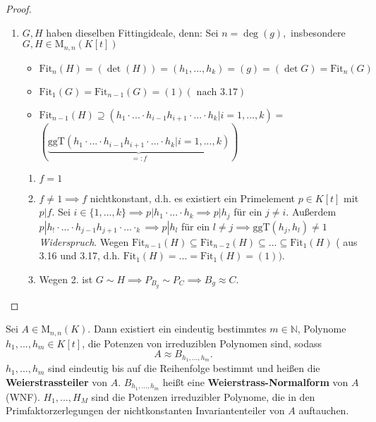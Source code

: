 \documentclass[a4paper, titlepage]{article}
\theoremstyle{definition}
\newcommand{\N}{\mathbb{N}}
\newcommand{\Fit}{\mathrm{Fit}}
\newcommand{\M}{\mathrm{M}}
\newcommand{\ggT}{\mathrm{ggT}}
\begin{document}
\begin{proof}
\begin{enumerate}[1.]
\begin{align*}
\begin{gmatrix}[p]
            & & & h_1 & &\\
            & & & & \ddots & \\
            & & & & & h_k
        \end{gmatrix}=:H\\
        P_{B_g}&\sim \begin{gmatrix}[p]
            1 & & & \\
            & \ddots &  &\\
            & & 1&\\
            & & &g
        \end{gmatrix}=: G
    \end{align*}
    \item $G,H$ haben dieselben Fittingideale, \newline denn: Sei $n=\deg(g),$ insbesondere $G,H\in\M_{n,n}(K[t])$\\
    \begin{itemize}
        \item $\Fit_{n}(H)=(\det(H))=(h_1,...,h_k)=(g)=(\det G)=\Fit_n(G)$
        \item $\Fit_{1}(G)= \Fit_{n-1}(G)=(1) (\text{ nach }3.17)$
        \item $\Fit_{n-1}(H)\supseteq (h_1\cdot...\cdot h_{i-1}h_{i+1}\cdot... \cdot h_k| i=1,...,k)=$ \newline$(\underbrace{\ggT(h_1\cdot...\cdot h_{i-1}h_{i+1}\cdot ...\cdot h_k|i=1,...,k)}_{=: f})$
    \end{itemize}
    \begin{enumerate}
        \item [\textbf{Behauptung:}] $f=1$
        \item [\textbf{Annahme:}] $f\neq 1 \implies f$ nichtkonstant, d.h. es existiert ein Primelement $p\in K[t]$ mit $p|f.$ Sei $i\in \{1,...,k\}\implies p|h_1\cdot...\cdot h_k\implies p|h_j$ für ein $j\neq i.$ Außerdem $p|h_!\cdot...\cdot h_{j-1}h_{j+1}\cdot...\cdot_{k}\implies p|h_l$ für ein $l\neq j\implies \ggT(h_j,h_l)\neq 1$ \textit{Widerspruch}. Wegen $\Fit_{n-1}(H)\subseteq \Fit_{n-2}(H)\subseteq ... \subseteq \Fit_{1}(H)$ ( aus 3.16 und 3.17, d.h. $\Fit_{1}(H)=...=\Fit_{1}(H)=(1)).$
        \item Wegen 2. ist $G\sim H \implies P_{B_g}\sim P_C\implies B_g\approx C.$ 
    \end{enumerate}
\end{enumerate}
\end{proof}
\begin{satz}
    Sei $A\in\M_{n,n}(K).$ Dann existiert ein eindeutig bestimmtes $m\in\N$, Polynome $h_1,...,h_m\in K[t]$, die Potenzen von irreduziblen Polynomen sind, sodass 
    $$A\approx B_{h_1,...,h_m}.$$
    $h_1,...,h_m$ sind eindeutig bis auf die Reihenfolge bestimmt und heißen die \textbf{Weierstrassteiler} von $A$.
    $B_{h_1,...,h_m}$ heißt eine \textbf{Weierstrass-Normalform} von $A$ (WNF). $H_1,...,H_M$ sind die Potenzen irreduzibler Polynome, die in den Primfaktorzerlegungen der nichtkonstanten Invariantenteiler von $A$ auftauchen.
\end{satz}
\end{document}
